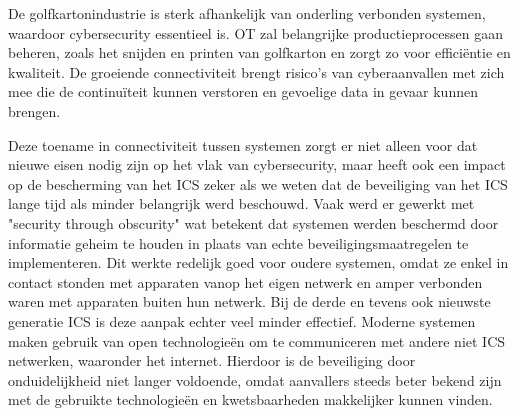 De golfkartonindustrie is sterk afhankelijk van onderling verbonden systemen, waardoor cybersecurity essentieel is. OT zal belangrijke productieprocessen gaan beheren, zoals het snijden en printen van golfkarton en zorgt zo voor efficiëntie en kwaliteit. De groeiende connectiviteit brengt risico's van cyberaanvallen met zich mee die de continuïteit kunnen verstoren en gevoelige data in gevaar kunnen brengen. \autocite{fefco2025}

Deze toename in connectiviteit tussen systemen zorgt er niet alleen voor dat nieuwe eisen nodig zijn op het vlak van cybersecurity, maar heeft ook een impact op de bescherming van het ICS zeker als we weten dat de beveiliging van het ICS lange tijd als minder belangrijk werd beschouwd. Vaak werd er gewerkt met "security through obscurity" wat betekent dat systemen werden beschermd door informatie geheim te houden in plaats van echte beveiligingsmaatregelen te implementeren. Dit werkte redelijk goed voor oudere systemen, omdat ze enkel in contact stonden met apparaten vanop het eigen netwerk en amper verbonden waren met apparaten buiten hun netwerk. Bij de derde en tevens ook nieuwste generatie ICS is deze aanpak echter veel minder effectief. Moderne systemen maken gebruik van open technologieën om te communiceren met andere niet ICS netwerken, waaronder het internet. Hierdoor is de beveiliging door onduidelijkheid niet langer voldoende, omdat aanvallers steeds beter bekend zijn met de gebruikte technologieën en kwetsbaarheden makkelijker kunnen vinden. \autocite{knowles2015}

















